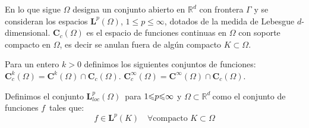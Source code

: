 En lo que sigue $\Omega $ designa un conjunto abierto en $\mathbb{R}^{d}$
con frontera $\Gamma $ y se consideran los espacios $\mathbf{L}^{p}\left(
\Omega \right) $, $1\mathbf{\leqslant }p\mathbf{\leqslant }\infty $, dotados
de la medida de Lebesgue $d$-dimensional. $\mathbf{C}_c(\Omega)$ es el espacio de funciones continuas en $\Omega$ con soporte compacto en $\Omega$, es decir se anulan fuera de algún compacto $K\subset \Omega$.

Para un entero $k>0$ definimos los siguientes conjuntos de funciones: $\mathbf{C}_c^k(\Omega)=\mathbf{C}^k(\Omega) \cap \mathbf{C}_c(\Omega)$.
$\mathbf{C}_c^\infty(\Omega)=\mathbf{C}^\infty(\Omega) \cap \mathbf{C}_c(\Omega)$.

\begin{defi}
	Definimos el conjunto $\mathbf{L}_{loc}^{p}(\Omega )$\ para $1\mathbf{%
		\leqslant }p\mathbf{\leqslant }\infty $ y $\Omega \subset \mathbb{R}^{d}%
	\mathit{\ }$como el conjunto de funciones $f$\ tales que:
	\[
	f\in \mathbf{L}^{p}(K)\quad \forall \text{compacto }K\subset \Omega
	\]
\end{defi}

